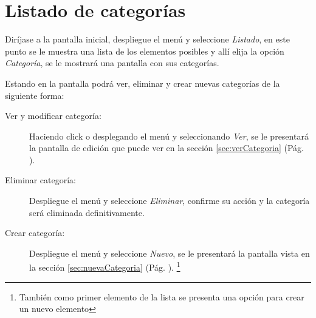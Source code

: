 \section{Listado de categor\'ias}
\label{sec:listadoCategorias}
Dir\'ijase a la pantalla inicial, despliegue el men\'u \blackberry y seleccione
\emph{Listado}, en este punto se le muestra una lista de los elementos posibles
y all\'i elija la opci\'on \emph{Categor\'ia}, se le mostrar\'a una pantalla
con sus categor\'ias.

Estando en la pantalla podr\'a ver, eliminar y crear nuevas
categor\'ias de la siguiente forma:

\begin{description}
\item[Ver y modificar categor\'ia:]Haciendo click o desplegando el men\'u
\blackberry y seleccionando \emph{Ver}, se le presentar\'a la pantalla de
edici\'on que puede ver en la secci\'on \ref{sec:verCategoria} (P\'ag.
\pageref{sec:verCategoria}).
\item[Eliminar categor\'ia:]Despliegue el men\'u \blackberry y seleccione
\emph{Eliminar}, confirme su acci\'on y la categor\'ia ser\'a eliminada
definitivamente.
\item[Crear categor\'ia:]Despliegue el men\'u \blackberry y seleccione \emph{Nuevo},
se le presentar\'a la pantalla vista en la secci\'on \ref{sec:nuevaCategoria}
(P\'ag. \pageref{sec:nuevaCategoria}).
\footnote{Tambi\'en como primer elemento de la lista se presenta una opci\'on
para crear un nuevo elemento}
\end{description}

